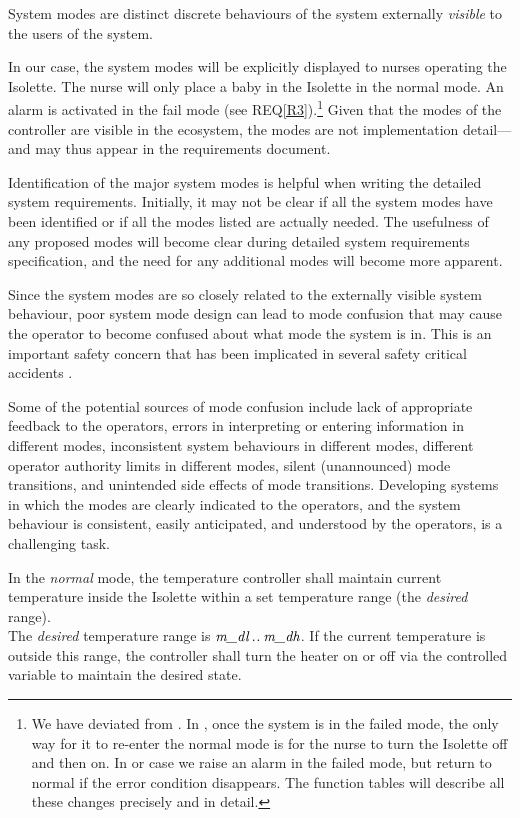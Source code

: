 \smallskip
\begin{mdframed}
System modes are distinct discrete behaviours of the system externally \emph{visible} to the users of the system.
\end{mdframed}

In our case, the system modes will be explicitly displayed to nurses operating the Isolette. The nurse will only place a baby in the Isolette in the normal mode. An alarm is activated in the fail mode (see REQ\ref{R3}).\footnote{%
We have deviated from \cite{REMH}. In \cite{REMH}, once the system is in the failed mode, the only way for it to re-enter the normal mode is for the nurse to turn the Isolette off and then on. In or case we raise an alarm in the failed mode, but return to normal if the error condition disappears. The function tables will describe all these changes precisely and in detail.}
Given that the modes of the controller are visible in the ecosystem, the modes are not implementation detail---and may thus appear in the requirements document.

Identification of the major system modes is helpful when writing the detailed system requirements. Initially, it may not be clear if all the system modes have been identified or if all the modes listed are actually needed. The usefulness of any proposed modes will become clear during detailed system requirements specification, and the need for any additional modes will become more apparent. 

Since the system modes are so closely related to the externally visible system behaviour, poor system mode design can lead to mode confusion that may cause the operator to become confused about what mode the system is in. This is an important safety concern that has been implicated in several safety critical accidents \cite{REMH}. 

Some of the potential sources of mode confusion include lack of appropriate feedback to the operators, errors in interpreting or entering information in different modes, inconsistent system behaviours in different modes, different operator authority limits in different modes, silent (unannounced) mode transitions, and unintended side effects of mode transitions. Developing systems in which the modes are clearly indicated to the operators, and the system behaviour is consistent, easily anticipated, and understood by the operators, is a challenging task.


{In the \emph{normal} mode, the temperature controller shall maintain current temperature inside the Isolette within a set temperature range (the \emph{desired} range).\\}
{The \emph{desired} temperature range is $\textit{m\_dl} \mathbin{.\mkern1mu.} \textit{m\_dh}$. If the current temperature  is outside this range, the controller shall turn the heater on or off via the controlled variable  to maintain the desired state.\smallskip}
\label{R2}

